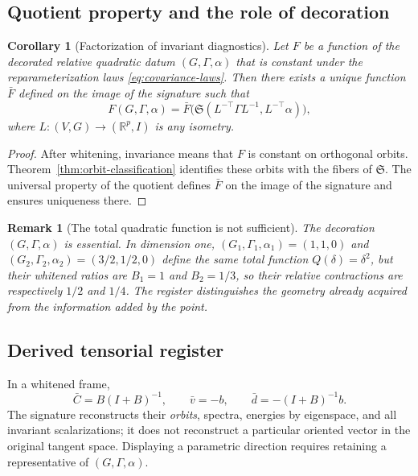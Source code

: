 \documentclass[10pt,a4paper]{article}
\newtheorem{corollary}[theorem]{Corollary}
\newtheorem{remark}[theorem]{Remark}
\newcommand{\R}{\mathbb{R}}
\newcommand{\Sigreg}{\mathfrak S}
\begin{document}
\subsection{Quotient property and the role of decoration}
\begin{corollary}[Factorization of invariant diagnostics]
Let $F$ be a function of the decorated relative quadratic datum $(G,\Gamma,\alpha)$ that is constant under the reparameterization laws \eqref{eq:covariance-laws}. Then there exists a unique function $\bar F$ defined on the \emph{image} of the signature such that
\begin{equation}
F(G,\Gamma,\alpha)
=\bar F\bigl(\Sigreg(L^{-\top}\Gamma L^{-1},L^{-\top}\alpha)\bigr),
\end{equation}
where $L:(V,G)\to(\R^p,I)$ is any isometry.
\end{corollary}
\begin{proof}
After whitening, invariance means that $F$ is constant on orthogonal orbits. Theorem~\ref{thm:orbit-classification} identifies these orbits with the fibers of $\Sigreg$. The universal property of the quotient defines $\bar F$ on the image of the signature and ensures uniqueness there.
\end{proof}

\begin{remark}[The total quadratic function is not sufficient]
The decoration $(G,\Gamma,\alpha)$ is essential. In dimension one, $(G_1,\Gamma_1,\alpha_1)=(1,1,0)$ and $(G_2,\Gamma_2,\alpha_2)=(3/2,1/2,0)$ define the same total function $Q(\delta)=\delta^2$, but their whitened ratios are $B_1=1$ and $B_2=1/3$, so their relative contractions are respectively $1/2$ and $1/4$. The register distinguishes the geometry already acquired from the information added by the point.
\end{remark}

\subsection{Derived tensorial register}
In a whitened frame,
\begin{equation}
\bar C=B(I+B)^{-1},
\qquad
\bar v=-b,
\qquad
\bar d=-(I+B)^{-1}b.
\label{eq:canonical-register}
\end{equation}
The signature reconstructs their \emph{orbits}, spectra, energies by eigenspace, and all invariant scalarizations; it does not reconstruct a particular oriented vector in the original tangent space. Displaying a parametric direction requires retaining a representative of $(G,\Gamma,\alpha)$.
\end{document}
